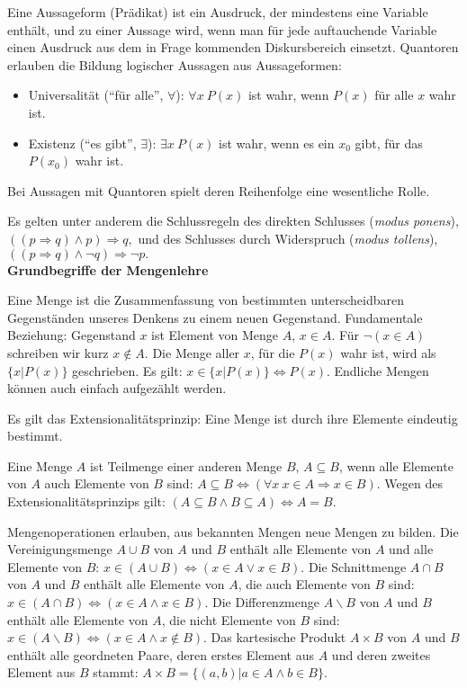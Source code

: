 \documentclass[a4paper,10pt]{article}
\begin{document}
Eine Aussageform (Prädikat) ist ein Ausdruck, der mindestens eine Variable enthält, und zu einer Aussage wird, wenn man für jede auftauchende Variable einen Ausdruck aus dem in Frage kommenden Diskursbereich einsetzt.
Quantoren erlauben die Bildung logischer Aussagen aus Aussageformen:
\begin{itemize}
\item Universalität (``für alle'', $\forall$): $\forall x~ P(x)$ ist wahr, wenn $P(x)$ für alle $x$ wahr ist.
\item Existenz (``es gibt'', $\exists$): $\exists x~P(x)$ ist wahr, wenn es ein $x_0$ gibt, für das $P(x_0)$ wahr ist.
\end{itemize}
Bei Aussagen mit Quantoren spielt deren Reihenfolge eine wesentliche Rolle.

Es gelten unter anderem die Schlussregeln des
direkten Schlusses ({\em modus ponens}), 
$
((p\Rightarrow q)\wedge p)\Rightarrow q,
$
und des Schlusses durch Widerspruch ({\em modus tollens}),
$
((p\Rightarrow q)\wedge \neg q)\Rightarrow \neg p.
$\\


{\bf Grundbegriffe der Mengenlehre}

Eine Menge ist die Zusammenfassung von bestimmten unterscheidbaren Gegen\-ständen unseres Denkens zu einem neuen Gegenstand. Fundamentale Beziehung: Gegenstand $x$ ist Element von Menge $A$, $x\in A$. Für $\neg(x\in A)$ schreiben wir kurz $x\not\in A$.
Die Menge aller $x$, für die $P(x)$ wahr ist, wird als $\{x|P(x)\}$ geschrieben. Es gilt: $x\in \{x|P(x)\}\Leftrightarrow P(x)$.
Endliche Mengen können auch einfach aufgezählt werden.

Es gilt das Extensionalitätsprinzip: Eine Menge ist durch ihre Elemente eindeutig bestimmt.

Eine Menge $A$ ist Teilmenge einer anderen Menge $B$, $A\subseteq B$, wenn alle Elemente von $A$ auch Elemente von $B$ sind: $A\subseteq B\Leftrightarrow(\forall x~x\in A\Rightarrow x\in B)$.
Wegen des Extensionalitätsprinzips gilt: $(A\subseteq B \wedge B\subseteq A)\Leftrightarrow A=B$.

Mengenoperationen erlauben, aus bekannten Mengen neue Mengen zu bilden.
{Die Vereinigungsmenge $A \cup B$ von $A$ und $B$ enthält alle Elemente von $A$ und alle Elemente von $B$: $x\in (A\cup B)\Leftrightarrow(x\in A \vee x\in B)$.}{\relax}
{Die Schnittmenge $A \cap B$ von $A$ und $B$ enthält alle Elemente von $A$, die auch Elemente von $B$ sind: $x\in (A\cap B)\Leftrightarrow(x\in A \wedge x\in B)$.}{\relax}
{Die Differenzmenge $A \backslash B$ von $A$ und $B$ enthält alle Elemente von $A$, die nicht Elemente von $B$ sind: $x\in (A\backslash B)\Leftrightarrow(x\in A \wedge x\not\in B)$.}{\relax}
Das kartesische Produkt $A\times B$ von $A$ und $B$ enthält alle geordneten Paare, deren erstes Element aus $A$ und deren zweites Element aus $B$ stammt: $A\times B=\{(a,b)|a\in A\wedge b\in B\}$.
\end{document}

